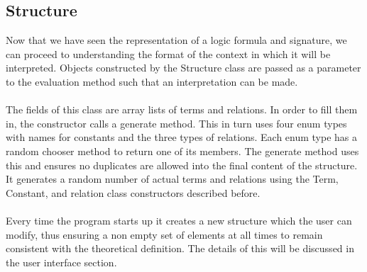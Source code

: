 \documentclass{report}
\begin{document}
\subsection{Structure}
Now that we have seen the representation of a logic formula and signature, we 
can proceed to understanding the format of the context in which it will be 
interpreted. Objects constructed by the Structure class are passed as a 
parameter to the evaluation method such that an interpretation can be made. 
\\ \\
The fields of this class are array lists of terms and relations. In order to 
fill them in, the constructor calls a generate method. This in turn uses four 
enum types with names for constants and the three types of relations. Each enum 
type has a random chooser method to return one of its members. The generate 
method uses this and ensures no duplicates are allowed into the final content of 
the structure. It generates a random number of actual terms and relations using 
the Term, Constant, and relation class constructors described before. 
\\ \\
Every time the program starts up it creates a new structure which the user can 
modify, thus ensuring a non empty set of elements at all times to remain 
consistent with the theoretical definition. The details of this will be 
discussed in the user interface section.
\end{document}
